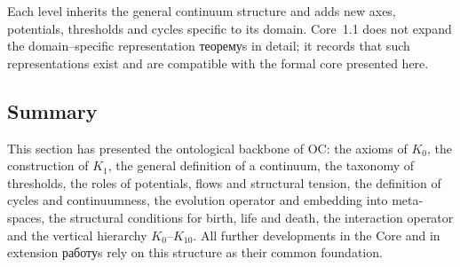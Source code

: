 Each level inherits the general continuum structure and adds new axes, potentials, thresholds and cycles specific to its domain.
Core~1.1 does not expand the domain–specific representation теоремуs in detail; it records that such representations exist and are compatible with the formal core presented here.

\subsection{Summary}

This section has presented the ontological backbone of OC:
the axioms of \(K_0\), the construction of \(K_1\), the general definition of a continuum, the taxonomy of thresholds, the roles of potentials, flows and structural tension, the definition of cycles and continuumness, the evolution operator and embedding into meta-spaces, the structural conditions for birth, life and death, the interaction operator and the vertical hierarchy \(K_0\)–\(K_{10}\).
All further developments in the Core and in extension работуs rely on this structure as their common foundation.
